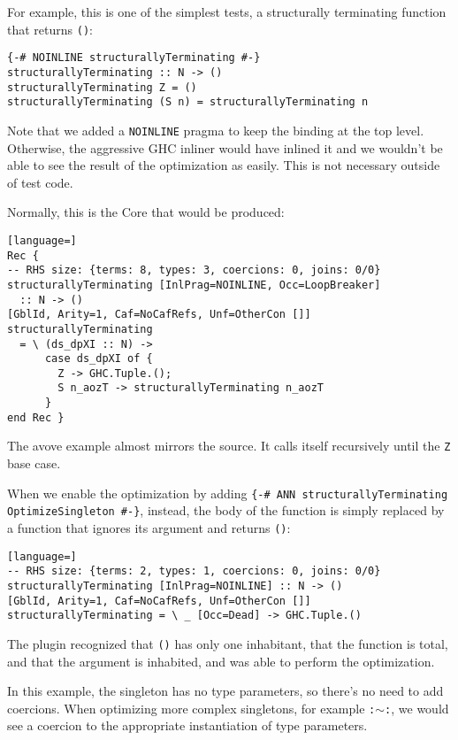 For example, this is one of the simplest tests, a structurally terminating function that returns \texttt{()}:

\begin{lstlisting}
{-# NOINLINE structurallyTerminating #-}
structurallyTerminating :: N -> ()
structurallyTerminating Z = ()
structurallyTerminating (S n) = structurallyTerminating n
\end{lstlisting}

Note that we added a \texttt{NOINLINE} pragma to keep the binding at the top level.
Otherwise, the aggressive GHC inliner would have inlined it and we wouldn't be able to see the result of the optimization as easily.
This is not necessary outside of test code.

Normally, this is the Core that would be produced:

\begin{lstlisting}[language=]
Rec {
-- RHS size: {terms: 8, types: 3, coercions: 0, joins: 0/0}
structurallyTerminating [InlPrag=NOINLINE, Occ=LoopBreaker]
  :: N -> ()
[GblId, Arity=1, Caf=NoCafRefs, Unf=OtherCon []]
structurallyTerminating
  = \ (ds_dpXI :: N) ->
      case ds_dpXI of {
        Z -> GHC.Tuple.();
        S n_aozT -> structurallyTerminating n_aozT
      }
end Rec }
\end{lstlisting}

The avove example almost mirrors the source.
It calls itself recursively until the \texttt{Z} base case.

When we enable the optimization by adding \texttt{\{-\# ANN structurallyTerminating OptimizeSingleton \#-\}}, instead, the body of the function is simply replaced by a function that ignores its argument and returns \texttt{()}:

\begin{lstlisting}[language=]
-- RHS size: {terms: 2, types: 1, coercions: 0, joins: 0/0}
structurallyTerminating [InlPrag=NOINLINE] :: N -> ()
[GblId, Arity=1, Caf=NoCafRefs, Unf=OtherCon []]
structurallyTerminating = \ _ [Occ=Dead] -> GHC.Tuple.()
\end{lstlisting}

The plugin recognized that \texttt{()} has only one inhabitant, that the function is total, and that the argument is inhabited, and was able to perform the optimization.

In this example, the singleton has no type parameters, so there's no need to add coercions.
When optimizing more complex singletons, for example \texttt{:$\sim$:}, we would see a coercion to the appropriate instantiation of type parameters.

